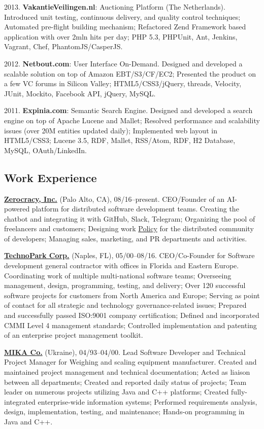 \documentclass[12pt]{article}
\begin{document}
2013. \textbf{VakantieVeilingen.nl}: Auctioning Platform (The Netherlands).
Introduced unit testing, continuous delivery, and quality control techniques;
Automated pre-flight building mechanism;
Refactored Zend Framework based application with over 2mln hits per day;
PHP 5.3, PHPUnit, Ant, Jenkins, Vagrant, Chef, PhantomJS/CasperJS.

2012. \textbf{Netbout.com}: User Interface On-Demand.
Designed and developed a scalable solution on top of Amazon EBT/S3/CF/EC2;
Presented the product on a few VC forums in Silicon Valley;
HTML5/CSS3/jQuery, threads, Velocity, JUnit, Mockito, Facebook API, jQuery, MySQL.

2011. \textbf{Expinia.com}: Semantic Search Engine.
Designed and developed a search engine on top of Apache Lucene and Mallet;
Resolved performance and scalability issues (over 20M entities updated daily);
Implemented web layout in HTML5/CSS3;
Lucene 3.5, RDF, Mallet, RSS/Atom, RDF, H2 Database, MySQL, OAuth/LinkedIn.

\subsection*{Work Experience}

\textbf{\href{http://www.zerocracy.com}{Zerocracy, Inc.}} (Palo Alto, CA), 08/16--present.
CEO/Founder of an AI-powered platform for distributed software development teams.
Creating the chatbot and integrating it with GitHub, Slack, Telegram;
Organizing the pool of freelancers and customers;
Designing work \href{https://www.zerocracy.com/policy.html}{Policy} for the distributed community of developers;
Managing sales, marketing, and PR departments and activities.

\textbf{\href{http://www.technoparkcorp.com}{TechnoPark Corp.}} (Naples, FL), 05/00--08/16.
CEO/Co-Founder for Software development general contractor with offices in Florida and Eastern Europe.
Coordinating work of multiple multi-national software teams;
Overseeing management, design, programming, testing, and delivery;
Over 120 successful software projects for customers from North America and Europe;
Serving as point of contact for all strategic and technology governance-related issues;
Prepared and successfully passed ISO:9001 company certification;
Defined and incorporated CMMI Level 4 management standards;
Controlled implementation and patenting of an enterprise project management toolkit.

\textbf{\href{http://www.mika.ua}{MIKA Co.}} (Ukraine), 04/93--04/00.
Lead Software Developer and Technical Project Manager for Weighing and scaling equipment manufacturer.
Created and maintained project management and technical documentation;
Acted as liaison between all departments;
Created and reported daily status of projects;
Team leader on numerous projects utilizing Java and C++ platforms;
Created fully-integrated enterprise-wide information systems;
Performed requirements analysis, design, implementation, testing, and maintenance;
Hands-on programming in Java and C++.
\end{document}
